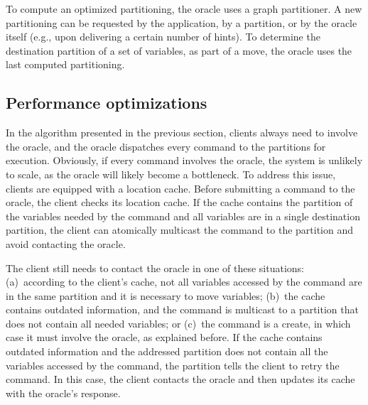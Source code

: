To compute an optimized partitioning, the oracle uses a graph partitioner. A new
partitioning can be requested by the application, by a partition, or by the
oracle itself (e.g., upon delivering a certain number of hints). To determine
the destination partition of a set of variables, as part of a move, the oracle
uses
the last computed partitioning.


\subsection{Performance optimizations}
\label{sec:optm}

In the algorithm presented in the previous section, clients always need to
involve the oracle, and the oracle dispatches every command to the partitions
for execution. Obviously, if every command involves the oracle, the system is
unlikely to scale, as the oracle will likely become a bottleneck. To address
this issue, clients are equipped with a location cache. Before submitting a
command to the oracle, the client checks its location cache. If the cache
contains the partition of the variables needed by the command and all variables
are in a single destination partition, the client can atomically multicast the
command to the partition and avoid contacting the oracle.

The client still needs to contact the oracle in one of these situations:
(a)~according to the client's cache, not all variables accessed by the command
are in the same partition and it is necessary to move variables; (b)~the cache
contains outdated information, and the command is multicast to a partition that
does not contain all needed variables; or (c)~the command is a create, in which
case it must involve the oracle, as explained before. If the cache contains
outdated information and the addressed partition does not contain all the
variables accessed by the command, the partition tells the client to retry the
command. In this case, the client contacts the oracle and then updates its cache
with the oracle's response.
